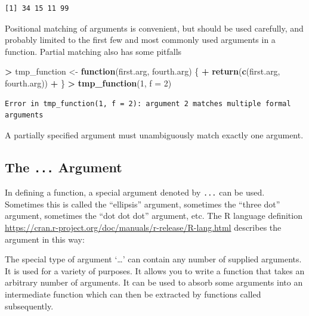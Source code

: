 \documentclass[]{krantz}
\makeatletter
\newenvironment{Shaded}{\begin{snugshade}}{\end{snugshade}}
\newcommand{\ControlFlowTok}[1]{\textcolor[rgb]{0.27,0.27,0.27}{\textbf{#1}}}
\newcommand{\DataTypeTok}[1]{\textcolor[rgb]{0.27,0.27,0.27}{#1}}
\newcommand{\DecValTok}[1]{\textcolor[rgb]{0.06,0.06,0.06}{#1}}
\newcommand{\KeywordTok}[1]{\textcolor[rgb]{0.27,0.27,0.27}{\textbf{#1}}}
\newcommand{\NormalTok}[1]{#1}
\newcommand{\OperatorTok}[1]{\textcolor[rgb]{0.43,0.43,0.43}{\textbf{#1}}}
\newcommand{\StringTok}[1]{\textcolor[rgb]{0.5,0.5,0.5}{#1}}
\renewenvironment{quote}{\begin{VF}}{\end{VF}}
\newenvironment{kframe}{%
\medskip{}
\setlength{\fboxsep}{.8em}
 \def\at@end@of@kframe{}%
 \ifinner\ifhmode%
  \def\at@end@of@kframe{\end{minipage}}%
  \begin{minipage}{\columnwidth}%
 \fi\fi%
 \def\FrameCommand##1{\hskip\@totalleftmargin \hskip-\fboxsep
 \colorbox{shadecolor}{##1}\hskip-\fboxsep
     \hskip-\linewidth \hskip-\@totalleftmargin \hskip\columnwidth}%
 \MakeFramed {\advance\hsize-\width
   \@totalleftmargin\z@ \linewidth\hsize
   \@setminipage}}%
 {\par\unskip\endMakeFramed%
 \at@end@of@kframe}
\renewenvironment{Shaded}{\begin{kframe}}{\end{kframe}}
\makeatother
\begin{document}
\begin{verbatim}
[1] 34 15 11 99
\end{verbatim}

Positional matching of arguments is convenient, but should be used carefully, and probably limited to the first few and most commonly used arguments in a function. Partial matching also has some pitfalls

\begin{Shaded}
\begin{Highlighting}[]
\OperatorTok{>}\StringTok{ }\NormalTok{tmp_function <-}\StringTok{ }\ControlFlowTok{function}\NormalTok{(first.arg, fourth.arg) \{}
\OperatorTok{+}\StringTok{   }\KeywordTok{return}\NormalTok{(}\KeywordTok{c}\NormalTok{(first.arg, fourth.arg))}
\OperatorTok{+}\StringTok{ }\NormalTok{\}}
\OperatorTok{>}\StringTok{ }\KeywordTok{tmp_function}\NormalTok{(}\DecValTok{1}\NormalTok{, }\DataTypeTok{f =} \DecValTok{2}\NormalTok{)}
\end{Highlighting}
\end{Shaded}

\begin{verbatim}
Error in tmp_function(1, f = 2): argument 2 matches multiple formal arguments
\end{verbatim}

A partially specified argument must unambiguously match exactly one argument.

\hypertarget{the-...-argument}{%
\subsection{\texorpdfstring{The \texttt{...} Argument}{The ... Argument}}\label{the-...-argument}}

In defining a function, a special argument denoted by \texttt{...} can be used. Sometimes this is called the ``ellipsis'' argument, sometimes the ``three dot'' argument, sometimes the ``dot dot dot'' argument, etc. The R language definition \url{https://cran.r-project.org/doc/manuals/r-release/R-lang.html} describes the argument in this way:

\begin{quote}
The special type of argument `\ldots{}' can contain any number of supplied arguments. It is used for a variety of purposes. It allows you to write a function that takes an arbitrary number of arguments. It can be used to absorb some arguments into an intermediate function which can then be extracted by functions called subsequently.
\end{quote}
\end{document}

